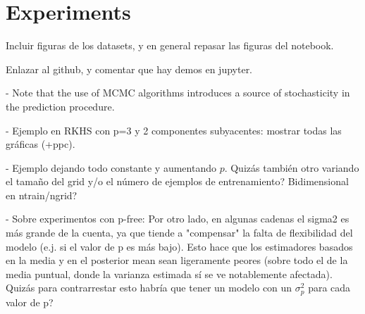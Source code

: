 %
%

\chapter{Experiments}\label{ch:experiments}



\begin{outcomment}
  Incluir figuras de los datasets, y en general repasar las figuras del notebook.

  Enlazar al github, y comentar que hay demos en jupyter.

  - Note that the use of MCMC algorithms introduces a source of stochasticity in the prediction procedure.

  - Ejemplo en RKHS con p=3 y 2 componentes subyacentes: mostrar todas las gráficas (+ppc).

  - Ejemplo dejando todo constante y aumentando \(p\). Quizás también otro variando el tamaño del grid y/o el número de ejemplos de entrenamiento? Bidimensional en ntrain/ngrid?

  - Sobre experimentos con p-free: Por otro lado, en algunas cadenas el sigma2 es más grande de la cuenta, ya que tiende a "compensar" la falta de flexibilidad del modelo (e.j. si el valor de p es más bajo). Esto hace que los estimadores basados en la media y en el posterior mean sean ligeramente peores (sobre todo el de la media puntual, donde la varianza estimada sí se ve notablemente afectada). Quizás para contrarrestar esto habría que tener un modelo con un $\sigma^2_p$ para cada valor de p?
\end{outcomment}
